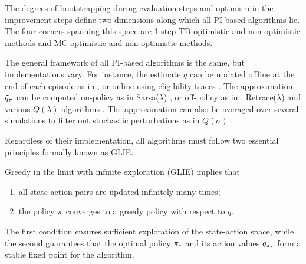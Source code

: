 \vspace{-0.2cm}


The degrees of bootstrapping during evaluation steps and optimism in the improvement steps 
define two dimensions along which all PI-based algorithms lie.
The four corners spanning this space are 1-step TD optimistic and non-optimistic methods and MC optimistic and non-optimistic methods.

The general framework of all PI-based algorithms is the same, but implementations vary.
For instance, the estimate $q$ can be updated offline at the end of each episode as in \citep[p. 99-101]{Sutton2018ReinforcementIntroduction},
or online using eligibility traces \citep{Singh1996ReinforcementTraces}.
The approximation $\Tilde{q}_\pi$ can be computed on-policy as in Sarsa($\lambda$) \citep{Sutton1996GeneralizationCoding},
or off-policy as in \citep[p. 111]{Sutton2018ReinforcementIntroduction}, Retrace($\lambda$) \citep{Munos2016SafeLearning} and various $Q(\lambda)$ algorithms \citep{Harutyunyan2016QCorrections, Sutton2014AEquivalence, Peng1996IncrementalQ-Learning, Watkins1989LearningRewards}.
The approximation can also be averaged over several simulations to filter out stochastic perturbations as in $Q(\sigma)$ \citep{DeAsis2018Multi-StepAlgorithm}.

Regardless of their implementation, all algorithms must follow two essential principles formally known as GLIE.
\vspace{-0.1cm}

\begin{definition}
\label{def: glie}
Greedy in the limit with infinite exploration (GLIE) implies that
\vspace{-0.4cm}
\begin{enumerate}
    \item all state-action pairs are updated infinitely many times;

    \item the policy $\pi$ converges to a greedy policy with respect to $q$.
\end{enumerate}
\end{definition}
\vspace{-0.5cm}
The first condition ensures sufficient exploration of the state-action space, while the second guarantees that the optimal policy ${\pi}_*$ and its action values $q_{{\pi}_*}$ form a stable fixed point for the algorithm.




